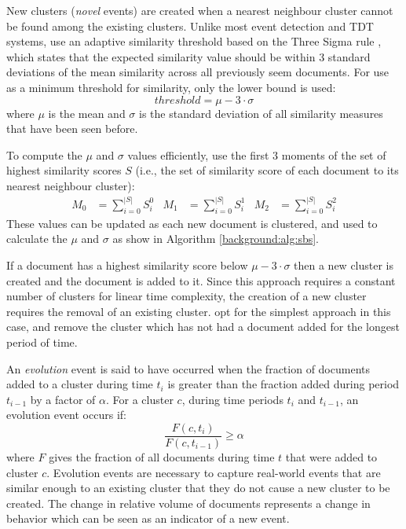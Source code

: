 New clusters (\emph{novel} events) are created when a nearest neighbour cluster cannot be found among the existing clusters.
Unlike most event detection and TDT systems, \cite{Aggarwal12} use an adaptive similarity threshold based on the Three Sigma rule \citep{Pukelsheim94}, which states that the expected similarity value should be within 3 standard deviations of the mean similarity across all previously seem documents.
For use as a minimum threshold for similarity, only the lower bound is used:
\begin{displaymath}
	threshold = \mu - 3 \cdot \sigma
\end{displaymath}
where $\mu$ is the mean and $\sigma$ is the standard deviation of all similarity measures that have been seen before.

To compute the $\mu$ and $\sigma$ values efficiently, \cite{Aggarwal12} use the first 3 moments of the set of highest similarity scores $S$ (i.e., the set of  similarity score of each document to its nearest neighbour cluster):
\begin{align*}
	M_0 &= \sum_{i = 0}^{|S|}{S_i^0} & M_1 &= \sum_{i = 0}^{|S|}{S_i^1} & M_2 &= \sum_{i = 0}^{|S|}{S_{i}^2}
\end{align*}
These values can be updated as each new document is clustered, and used to calculate the $\mu$ and $\sigma$ as show in Algorithm \ref{background:alg:sbs}.

If a document has a highest similarity score below $\mu - 3 \cdot \sigma$ then a new cluster is created and the document is added to it.
Since this approach requires a constant number of clusters for linear time complexity, the creation of a new cluster requires the removal of an existing cluster.
\cite{Aggarwal12} opt for the simplest approach in this case, and remove the cluster which has not had a document added for the longest period of time.

An \emph{evolution} event is said to have occurred when the fraction of documents added to a cluster during time $t_{i}$ is greater than the fraction added during period $t_{i-1}$ by a factor of $\alpha$.
For a cluster $c$, during time periods $t_i$ and $t_{i-1}$, an evolution event occurs if:
\begin{displaymath}
	\frac{F(c, t_i)}{F(c, t_{i-1})} \geq \alpha
\end{displaymath}
where $F$ gives the fraction of all documents during time $t$ that were added to cluster $c$.
Evolution events are necessary to capture real-world events that are similar enough to an existing cluster that they do not cause a new cluster to be created.
The change in relative volume of documents represents a change in behavior which can be seen as an indicator of a new event.

